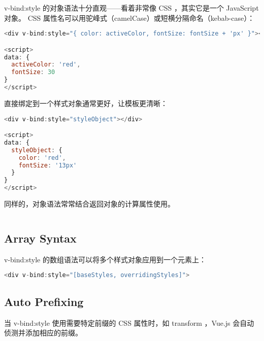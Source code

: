 v-bind:style 的对象语法十分直观——看着非常像 CSS ，其实它是一个 JavaScript 对象。 CSS 属性名可以用驼峰式（camelCase）或短横分隔命名（kebab-case）：


\begin{lstlisting}[language=JavaScript]
<div v-bind:style="{ color: activeColor, fontSize: fontSize + 'px' }"></div>

<script>
data: {
  activeColor: 'red',
  fontSize: 30
}
</script>
\end{lstlisting}

直接绑定到一个样式对象通常更好，让模板更清晰：


\begin{lstlisting}[language=JavaScript]
<div v-bind:style="styleObject"></div>

<script>
data: {
  styleObject: {
    color: 'red',
    fontSize: '13px'
  }
}
</script>
\end{lstlisting}

同样的，对象语法常常结合返回对象的计算属性使用。

\begin{lstlisting}[language=JavaScript]

\end{lstlisting}



\subsection{Array Syntax}

v-bind:style 的数组语法可以将多个样式对象应用到一个元素上：


\begin{lstlisting}[language=JavaScript]
<div v-bind:style="[baseStyles, overridingStyles]">
\end{lstlisting}





\subsection{Auto Prefixing}

当 v-bind:style 使用需要特定前缀的 CSS 属性时，如 transform ，Vue.js 会自动侦测并添加相应的前缀。

